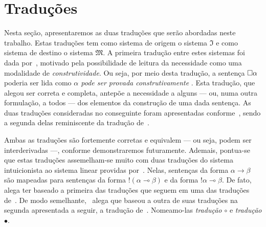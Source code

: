 \section{Traduções}
    Nesta seção, apresentaremos as duas traduções que serão abordadas neste trabalho.
    Estas traduções tem como sistema de origem o sistema $\mathfrak{I}$ e como sistema de destino o sistema $\mathfrak{M}$.
    A primeira tradução entre estes sistemas foi dada por~\cite{Gödel.1986b}, motivado pela possibilidade de leitura da necessidade como uma modalidade de \emph{construtividade}.
    Ou seja, por meio desta tradução, a sentença $\Box\alpha$ poderia ser lida como \textit{$\alpha$ pode ser provada construtivamente} \citep{Troelstra+Schwichtenberg.2000}.
    Esta tradução, que~\cite{Gödel.1986b} alegou ser correta e completa, antepõe a necessidade a alguns --- ou, numa outra formulação, a todos --- dos elementos da construção de uma dada sentença.
    As duas traduções consideradas no conseguinte foram apresentadas conforme~\cite{Troelstra+Schwichtenberg.2000}, sendo a segunda delas reminiscente da tradução de~\cite{Gödel.1986b}.

    \vspace{0.5\baselineskip}
    Ambas as traduções são fortemente corretas e equivalem --- ou seja, podem ser interderivadas ---, conforme demonstraremos futuramente.
    Ademais, pontua-se que estas traduções assemelham-se muito com duas traduções do sistema intuicionista ao sistema linear providas por~\cite{Girard.1987}.
    Nelas, sentenças da forma $\alpha\to\beta$ são mapeadas para sentenças da forma $!(\alpha\multimap\beta)$ e da forma $!\alpha\multimap\beta$.
    De fato,~\cite{Troelstra+Schwichtenberg.2000} alega ter baseado a primeira das traduções que seguem em uma das traduções de~\cite{Girard.1987}.
    De modo semelhante,~\cite{Girard.1987} alega que baseou a outra de suas traduções na segunda apresentada a seguir, a tradução de~\cite{Gödel.1986b}.
    Nomeamo-las \emph{tradução $\circ$} e \emph{tradução $\bullet$}.

